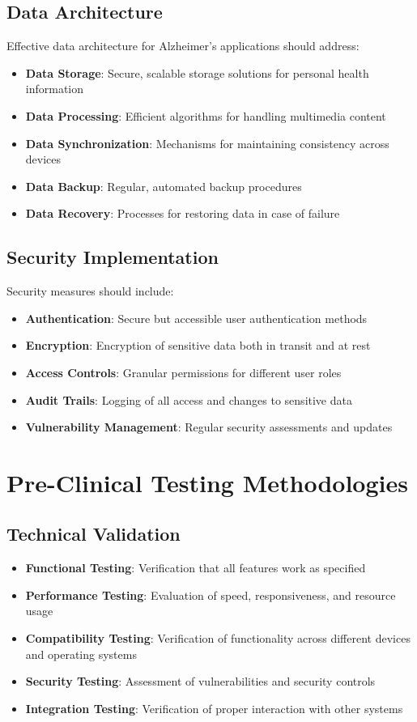 \subsection{Data Architecture}
Effective data architecture for Alzheimer's applications should address:
\begin{itemize}
    \item \textbf{Data Storage}: Secure, scalable storage solutions for personal health information
    \item \textbf{Data Processing}: Efficient algorithms for handling multimedia content
    \item \textbf{Data Synchronization}: Mechanisms for maintaining consistency across devices
    \item \textbf{Data Backup}: Regular, automated backup procedures
    \item \textbf{Data Recovery}: Processes for restoring data in case of failure
\end{itemize}

\subsection{Security Implementation}
Security measures should include:
\begin{itemize}
    \item \textbf{Authentication}: Secure but accessible user authentication methods
    \item \textbf{Encryption}: Encryption of sensitive data both in transit and at rest
    \item \textbf{Access Controls}: Granular permissions for different user roles
    \item \textbf{Audit Trails}: Logging of all access and changes to sensitive data
    \item \textbf{Vulnerability Management}: Regular security assessments and updates
\end{itemize}

\section{Pre-Clinical Testing Methodologies}
\subsection{Technical Validation}
\begin{itemize}
    \item \textbf{Functional Testing}: Verification that all features work as specified
    \item \textbf{Performance Testing}: Evaluation of speed, responsiveness, and resource usage
    \item \textbf{Compatibility Testing}: Verification of functionality across different devices and operating systems
    \item \textbf{Security Testing}: Assessment of vulnerabilities and security controls
    \item \textbf{Integration Testing}: Verification of proper interaction with other systems
\end{itemize}

